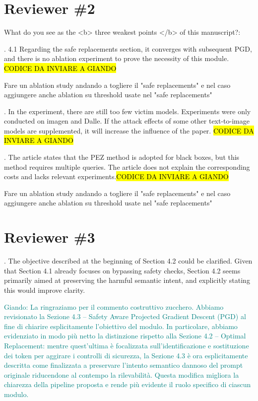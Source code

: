 \documentclass{ar2rc}
\newcommand{\giando}[1]{\textcolor{teal}{Giando: #1}}
\begin{document}
\AR 

\section{Reviewer \#2} 
\RC What do you see as the <b> three weakest points </b> of this manuscript?:

    . 4.1 Regarding the safe replacements section, it converges with subsequent PGD, and there is no ablation experiment to prove the necessity of this module. \hl{CODICE DA INVIARE A GIANDO}

       \AC Fare un ablation study andando a togliere il "safe replacements" e nel caso aggiungere anche ablation su threshold usate nel "safe replacements"

    . In the experiment, there are still too few victim models. Experiments were only conducted on imagen and Dalle. If the attack effects of some other text-to-image models are supplemented, it will increase the influence of the paper. \hl{CODICE DA INVIARE A GIANDO}

       \AC 

       
    . The article states that the PEZ method is adopted for black boxes, but this method requires multiple queries. The article does not explain the corresponding costs and lacks relevant experiments.\hl{CODICE DA INVIARE A GIANDO}

   \AC Fare un ablation study andando a togliere il "safe replacements" e nel caso aggiungere anche ablation su threshold usate nel "safe replacements"

\AR 

\section{Reviewer \#3} 

    . The objective described at the beginning of Section 4.2 could be clarified. Given that Section 4.1 already focuses on bypassing safety checks, Section 4.2 seems primarily aimed at preserving the harmful semantic intent, and explicitly stating this would improve clarity.

    \AC \giando{La ringraziamo per il commento costruttivo zucchero. Abbiamo revisionato la Sezione 4.3 – Safety Aware Projected Gradient Descent (PGD) al fine di chiarire esplicitamente l’obiettivo del modulo. In particolare, abbiamo evidenziato in modo più netto la distinzione rispetto alla Sezione 4.2 – Optimal Replacement: mentre quest’ultima è focalizzata sull’identificazione e sostituzione dei token per aggirare i controlli di sicurezza, la Sezione 4.3 è ora esplicitamente descritta come finalizzata a preservare l’intento semantico dannoso del prompt originale riducendone al contempo la rilevabilità. Questa modifica migliora la chiarezza della pipeline proposta e rende più evidente il ruolo specifico di ciascun modulo.}
\end{document}
